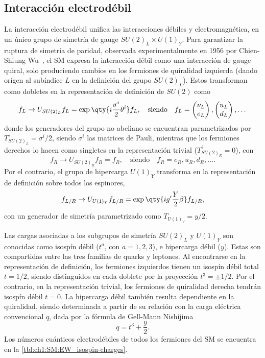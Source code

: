 \subsection{Interacción electrodébil}

La interacción electrodébil unifica las interacciones débiles y electromagnética, en un único grupo de simetría de gauge $SU(2)_L \times U(1)_Y$. Para garantizar la ruptura de simetría de paridad, observada experimentalmente en 1956 por Chien-Shiung Wu~\cite{Wu1957}, el SM expresa la interacción débil como una interacción de gauge quiral, solo produciendo cambios en los fermiones de quiralidad izquierda (dando orígen al subíndice $L$ en la definición del grupo $SU(2)_L$). Estos transforman como dobletes en la representación de definición de $SU(2)$ como
\[
  f_L \to U_{SU(2)_L} f_L = \exp\qty{i \frac{\sigma^i}{2} \theta^i} f_L,
  \quad \text{siendo} \quad
  f_L = \begin{pmatrix} \nu_L \\ e_L \end{pmatrix}, \begin{pmatrix} u_L \\ d_L \end{pmatrix}, \dots
\]
donde los generadores del grupo no abeliano se encuentran parametrizados por $T^i_{SU(2)_L} = \sigma^i/2$, siendo $\sigma^i$ las matrices de Pauli, mientras que los fermiones derechos lo hacen como singletes en la representación trivial ($T^i_{SU(2)_R} = 0$), con 
\[
  f_R \to U_{SU(2)_R} f_R = f_R,
  \quad \text{siendo} \quad
  f_R = e_R, u_R, d_R, \dots.
\]
Por el contrario, el grupo de hipercarga $U(1)_Y$ transforma en la representación de definición sobre todos los espinores, 
\[ f_{L/R} \to U_{U(1)_Y} f_{L/R} = \exp\qty{i g' \frac{Y}{2} \beta} f_{L/R}, \]
con un generador de simetría parametrizado como $T_{U(1)_Y} = y/2$.

Las cargas asociadas a los subgrupos de simetría $SU(2)_L$ y $U(1)_Y$ son conocidas como isospín débil ($t^a$, con $a = 1, 2, 3$), e hipercarga débil ($y$). Estas son compartidas entre las tres familias de quarks y leptones. Al encontrarse en la representación de definición, los fermiones izquierdos tienen un isospín débil total $t = 1/2$, siendo distinguidos en cada doblete por la proyección $t^3 = \pm 1/2$. Por el contrario, en la representación trivial, los fermiones de quiralidad derecha tendrán isospín débil $t = 0$. La hipercarga débil también resulta dependiente en la quiralidad, siendo determinada a partir de su relación con la carga eléctrica convencional $q$, dada por la fórmula de Gell-Mann Nishijima
\begin{equation} q = t^3 + \frac{y}{2}. \label{eq:ch1:SM:Gell-Man_Nishijima} \end{equation}
Los números cuánticos electrodébiles de todos los fermiones del SM se encuentra en la \cref{tbl:ch1:SM:EW_isospin-charges}.

